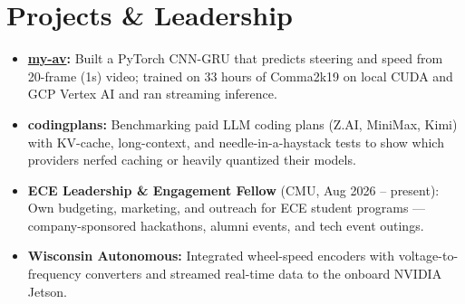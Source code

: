 \documentclass[11pt, letterpaper]{article}
\begin{document}
\section{Projects \& Leadership}
\begin{itemize}
  \item \textbf{\href{https://github.com/lordphone/my-av}{my-av}:} Built a PyTorch CNN-GRU that predicts steering and speed from 20-frame (1s) video; trained on 33 hours of Comma2k19 on local CUDA and GCP Vertex AI and ran streaming inference.
  \item \textbf{codingplans:} Benchmarking paid LLM coding plans (Z.AI, MiniMax, Kimi) with KV-cache, long-context, and needle-in-a-haystack tests to show which providers nerfed caching or heavily quantized their models.
  \item \textbf{ECE Leadership \& Engagement Fellow} (CMU, Aug 2026 -- present): Own budgeting, marketing, and outreach for ECE student programs --- company-sponsored hackathons, alumni events, and tech event outings.
  \item \textbf{Wisconsin Autonomous:} Integrated wheel-speed encoders with voltage-to-frequency converters and streamed real-time data to the onboard NVIDIA Jetson.
\end{itemize}
\end{document}
